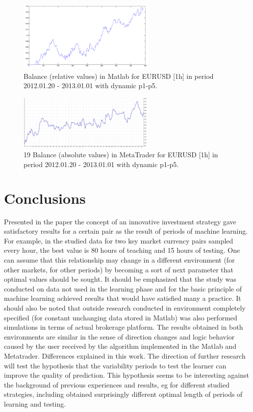 \documentclass[runningheads,a4paper]{llncs}
\begin{document}
\begin{figure}[h!]
\centering
\includegraphics[width = 0.6\textwidth]{figures/rys18.png}
\caption{Balance (relative values) in Matlab for EURUSD [1h] in period 2012.01.20 - 2013.01.01 with dynamic p1-p5.}
\label{fig:fig18}
\end{figure}
\FloatBarrier
\begin{figure}[h!]
\centering
\includegraphics[width = 0.6\textwidth]{figures/rys19.png}
\caption{19 Balance (absolute values) in MetaTrader for EURUSD [1h] in period 2012.01.20 - 2013.01.01 with dynamic p1-p5.}
\label{fig:fig19}
\end{figure}
\FloatBarrier

\section{Conclusions}

Presented in the paper the concept of an innovative investment strategy gave satisfactory results for a certain pair as the result of periods of machine learning. For example, in the studied data for two key market currency pairs sampled every hour, the best value is 80 hours of teaching and 15 hours of testing. One can assume that this relationship may change in a different environment (for other markets, for other periods) by becoming a sort of next parameter that optimal values should be sought. It should be emphasized that the study was conducted on data not used in the learning phase and for the basic principle of machine learning achieved results that would have satisfied many a practice. It should also be noted that outside research conducted in environment completely specified (for constant unchanging data stored in Matlab) was also performed simulations in terms of actual brokerage platform. The results obtained in both environments are similar in the sense of direction changes and logic behavior caused by the user received by the algorithm implemented in the Matlab and Metatrader. Differences explained in this work.
The direction of further research will test the hypothesis that the variability periods to test the learner can improve the quality of prediction. This hypothesis seems to be interesting against the background of previous experiences and results, eg for different studied strategies, including \cite{Wilinski2014} obtained surprisingly different optimal length of periods of learning and testing.





\end{document}
